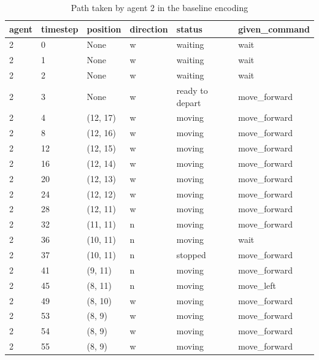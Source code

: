 \begin{table}[H]
  \centering
  \caption{Path taken by agent 2 in the baseline encoding}
  \label{tab:baseline2}
  \begin{tabular}{llllll}
    \toprule
    agent & timestep & position & direction & status & given\_command \\
    \midrule
2 & 0 & None & w & waiting & wait \\
2 & 1 & None & w & waiting & wait \\
2 & 2 & None & w & waiting & wait \\
2 & 3 & None & w & ready to depart & move\_forward \\
2 & 4 & (12, 17) & w & moving & move\_forward \\
2 & 8 & (12, 16) & w & moving & move\_forward \\
2 & 12 & (12, 15) & w & moving & move\_forward \\
2 & 16 & (12, 14) & w & moving & move\_forward \\
2 & 20 & (12, 13) & w & moving & move\_forward \\
2 & 24 & (12, 12) & w & moving & move\_forward \\
2 & 28 & (12, 11) & w & moving & move\_forward \\
2 & 32 & (11, 11) & n & moving & move\_forward \\
2 & 36 & (10, 11) & n & moving & wait \\
2 & 37 & (10, 11) & n & stopped & move\_forward \\
2 & 41 & (9, 11) & n & moving & move\_forward \\
2 & 45 & (8, 11) & n & moving & move\_left \\
2 & 49 & (8, 10) & w & moving & move\_forward \\
2 & 53 & (8, 9) & w & moving & move\_forward \\
2 & 54 & (8, 9) & w & moving & move\_forward \\
2 & 55 & (8, 9) & w & moving & move\_forward \\
    \bottomrule
  \end{tabular}
\end{table}

